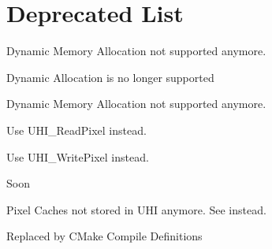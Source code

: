 \chapter{Deprecated List}
\hypertarget{deprecated}{}\label{deprecated}

\begin{DoxyRefList}
\item[Global \doxylink{linear__algebra_8h_a9feddc49bf0fbb6efcbd15f5ac2adcfb}{Delete\+Vector} (data\+\_\+t \texorpdfstring{$\ast$}{*}v)]\label{deprecated__deprecated000007}%
%
Dynamic Memory Allocation not supported anymore.  
\item[Global \doxylink{hash__table_8h_ac8f1faa6debf15cdd31b24336055ad07}{Hash\+\_\+\+Delete\+Hash\+Table} (\doxylink{struct_hash_table}{Hash\+Table} \texorpdfstring{$\ast$}{*}hash)]\label{deprecated__deprecated000002}%
%
Dynamic Allocation is no longer supported  
\item[Global \doxylink{linear__algebra_8h_ad945abceb6b4b4958eec7953858db9f2}{Init\+Vector} (int32\+\_\+t \texorpdfstring{$\ast$}{*}\texorpdfstring{$\ast$}{*}v, UINT len)]\label{deprecated__deprecated000006}%
%
Dynamic Memory Allocation not supported anymore.  
\item[Global \doxylink{uhi__io_8h_aad573fb88befb1cd5c553c20a32027a9}{Proxy\+\_\+\+Get\+Pixel} (u\+IMG \texorpdfstring{$\ast$}{*}h\+IMG, INDEX x, INDEX y, INDEX z)]\label{deprecated__deprecated000004}%
%
Use UHI\+\_\+\+Read\+Pixel instead.  
\item[Global \doxylink{uhi__io_8h_a1ec6bacb78062b9b8dde4cf3e3eeb923}{Proxy\+\_\+\+Set\+Pixel} (u\+IMG \texorpdfstring{$\ast$}{*}h\+IMG, INDEX x, INDEX y, INDEX z, PIXEL value)]\label{deprecated__deprecated000005}%
%
Use UHI\+\_\+\+Write\+Pixel instead.  
\item[Global \doxylink{local__differences_8h_a2fee6f8dd7f3cd3ed1ae75161294c4c4}{Ps} (z)]\label{deprecated__deprecated000008}%
%
Soon  
\item[Global \doxylink{uhi__io_8h_a6aba86f49a9e77ca452352dd1ef8d4af}{UHI\+\_\+\+CACHE\+\_\+\+LENGTH} ]\label{deprecated__deprecated000003}%
%
Pixel Caches not stored in UHI anymore. See  instead.  
\item[Global \doxylink{global__constants_8h_a2098ddebdb26af02b8f4bcf35a665815}{x86\+\_\+\+GCC} ]\label{deprecated__deprecated000001}%
%
Replaced by CMake Compile Definitions 
\end{DoxyRefList}